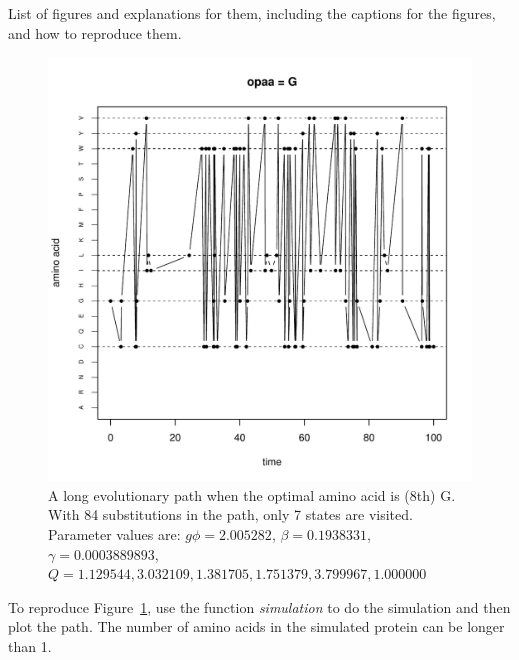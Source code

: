 \documentclass[12pt]{article}
\begin{document}
\setlength{\parindent}{0cm}
List of figures and explanations for them, including the captions for the figures, and how to reproduce them.\\
\begin{figure}[h]
\includegraphics[width=\textwidth]{evopath_opaa8.pdf}
\caption{A long evolutionary path when the optimal amino acid is (8th) G. With 84 substitutions in the path, only 7 states are visited. Parameter values are: $g\phi = 2.005282$, $\beta = 0.1938331$, $\gamma = 0.0003889893$, $Q = {1.129544, 3.032109, 1.381705, 1.751379, 3.799967, 1.000000}$}
\label{fig:evopath}
\end{figure}

To reproduce Figure~\ref{fig:evopath}, use the function {\it simulation} to do the simulation and then plot the path. The number of amino acids in the simulated protein can be longer than 1. 
\end{document}
